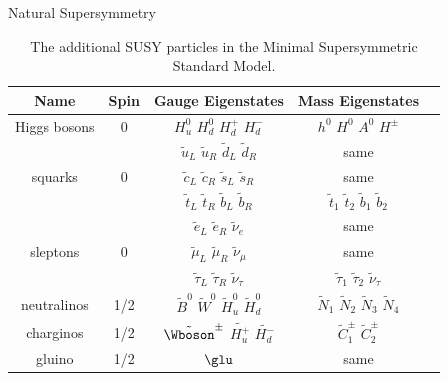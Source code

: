 \begin{section}{Natural Supersymmetry}
\begin{table}[tb!]
\centering
\begin{tabular}{|c|c|c|c|c|}
\hline
Name                       &  Spin                &  Gauge Eigenstates                                            &  Mass Eigenstates \\
\hline
\hline  
Higgs bosons               &  0                   &  $H^0_u$ $H^0_d$ $H^+_d$ $H^-_d$                              &  $h^0$ $H^0$ $A^0$ $H^\pm$ \\ 
\hline
\multirow{3}{*}{squarks}   &  \multirow{3}{*}{0}  &  $\tilde{u}_L$ $\tilde{u}_R$ $\tilde{d}_L$ $\tilde{d}_R$      &  same \\
                           &                      &  $\tilde{c}_L$ $\tilde{c}_R$ $\tilde{s}_L$ $\tilde{s}_R$      &  same \\
                           &                      &  $\tilde{t}_L$ $\tilde{t}_R$ $\tilde{b}_L$ $\tilde{b}_R$      &  $\tilde{t}_1$ $\tilde{t}_2$ $\tilde{b}_1$ $\tilde{b}_2$\\
\hline
\multirow{3}{*}{sleptons}  &  \multirow{3}{*}{0}  &  $\tilde{e}_L$ $\tilde{e}_R$ $\tilde{\nu}_e$                  &  same \\
                           &                      &  $\tilde{\mu}_L$ $\tilde{\mu}_R$ $\tilde{\nu}_\mu$            &  same \\
                           &                      &  $\tilde{\tau}_L$ $\tilde{\tau}_R$ $\tilde{\nu}_\tau$         &  $\tilde{\tau}_1$ $\tilde{\tau}_2$ $\tilde{\nu}_\tau$\\
\hline
neutralinos                &  1/2                 &  $\tilde{B}^0$ $\tilde{W}^0$ $\tilde{H}^0_u$ $\tilde{H}^0_d$  &  $\tilde{N}_1$ $\tilde{N}_2$ $\tilde{N}_3$ $\tilde{N}_4$\\
\hline
charginos                  &  1/2                 & $\tilde{\Wboson}^\pm$ $\tilde{H^+_u}$ $\tilde{H^-_d}$         &  $\tilde{C}^\pm_1$ $\tilde{C}^\pm_2$ \\
\hline
gluino                     &  1/2                 & $\glu$                                                        &  same \\
\hline
\end{tabular}
\caption{The additional SUSY particles in the Minimal Supersymmetric Standard Model.}
\label{tab:susy_particles}
\end{table}


\end{section}

